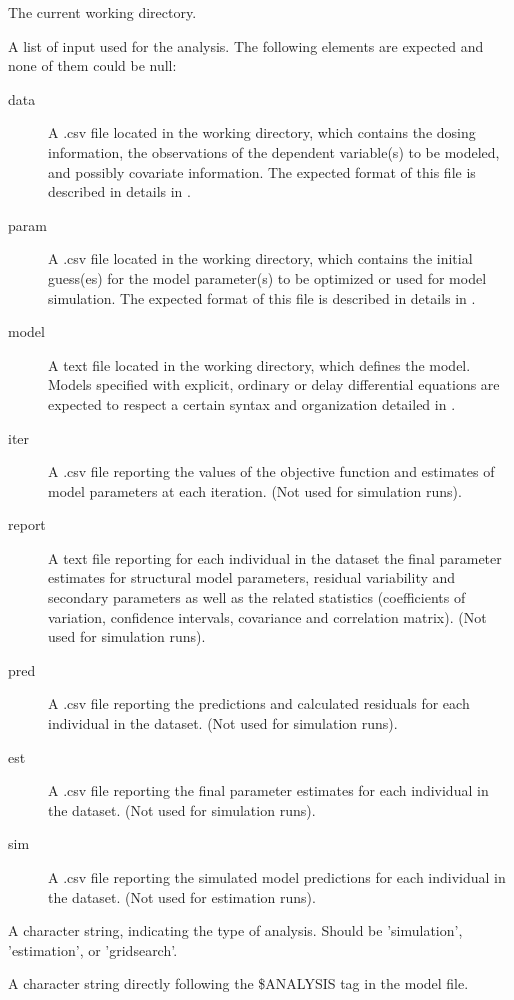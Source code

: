 \begin{Arguments}
\begin{ldescription}
\item[\code{curwd}] The current working directory.
\item[\code{files}] A list of input used for the analysis. The following elements are
expected and none of them could be null: \begin{description}

\item[data] A .csv file located in the working directory, which contains
the dosing information, the observations of the dependent variable(s)
to be modeled, and possibly covariate information. The expected format 
of this file is described in details in .
\item[param] A .csv file located in the working directory, which contains
the initial guess(es) for the model parameter(s) to be optimized or used
for model simulation. The expected format of this file is described in
details in .
\item[model] A text file located in the working directory, which defines 
the model. Models specified with explicit, ordinary or delay 
differential equations are expected to respect a certain syntax and 
organization detailed in .
\item[iter] A .csv file reporting the values of the objective function
and estimates of model parameters at each iteration.  (Not used for 
simulation runs).
\item[report] A text file reporting for each individual in the dataset the
final parameter estimates for structural model parameters, residual 
variability and secondary parameters as well as the related statistics 
(coefficients of variation, confidence intervals, covariance and 
correlation matrix). (Not used for simulation runs).
\item[pred] A .csv file reporting the predictions and calculated residuals
for each individual in the dataset. (Not used for simulation runs).
\item[est] A .csv file reporting the final parameter estimates for each
individual in the dataset. (Not used for simulation runs).
\item[sim] A .csv file reporting the simulated model predictions for each 
individual in the dataset. (Not used for estimation runs).

\end{description}


\item[\code{runtype}] A character string, indicating the type of analysis. Should be
'simulation', 'estimation', or 'gridsearch'.
\item[\code{analysis}] A character string directly following the \$ANALYSIS tag in the
model file.
\end{ldescription}
\end{Arguments}
